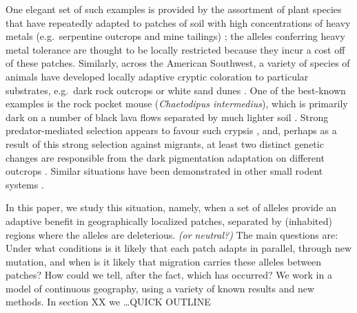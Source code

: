 \documentclass{article}
\newcommand{\plr}[1]{{\it\color{blue}(#1)}}
\begin{document}
One elegant set of such examples is provided by the assortment of plant species 
that have repeatedly adapted to patches of soil with high concentrations of heavy metals
(e.g.\ serpentine outcrops and mine tailings) \citep{turner2010serpentine,mimulus};
the alleles conferring heavy metal tolerance are thought to be locally restricted 
because they incur a cost off of these patches. 
Similarly, across the American Southwest, a variety of species of animals have developed locally adaptive cryptic coloration
to particular substrates, e.g.\ dark rock outcrops or white sand dunes \citep{benson1933concealing}.
One of the best-known examples is the rock pocket mouse (\textit{Chaetodipus intermedius}),
which is primarily dark on a number of black lava flows separated by much lighter soil \citep{dice1940ecologic}.
Strong predator-mediated selection appears to favour such crypsis \citep{kaufman1974adaptive},
and, perhaps as a result of this strong selection against migrants, 
at least two distinct genetic changes are responsible from the dark pigmentation adaptation on different outcrops \citep{nachman2003different}. 
Similar situations have been demonstrated in other small rodent systems \citep{steiner2009genetic,kingsley2009melanism}.

In this paper, we study this situation, namely,
when a set of alleles provide an adaptive benefit in geographically localized patches, 
separated by (inhabited) regions where the alleles are deleterious.
\plr{or neutral?}
The main questions are:
Under what conditions is it likely that each patch adapts in parallel, through new mutation,
and when is it likely that migration carries these alleles between patches?
How could we tell, after the fact, which has occurred?
We work in a model of continuous geography,
using a variety of known results and new methods.
In section XX we \dots QUICK OUTLINE




\end{document}
